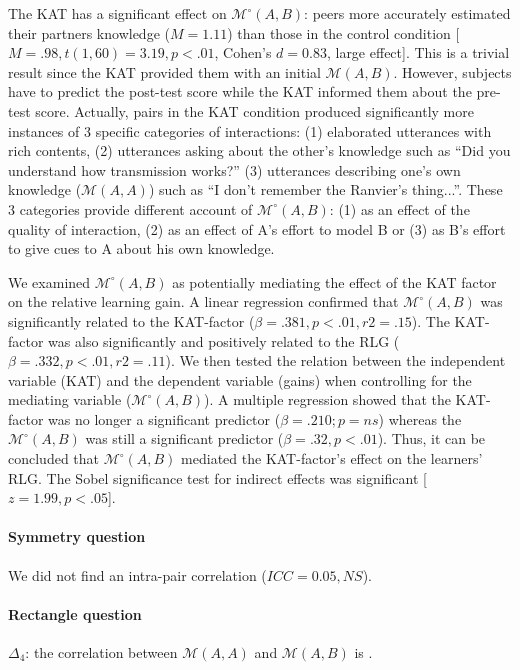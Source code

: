 \documentclass[twocolumn]{article}
\newcommand{\gmodel}[2]{{$\mathcal{M}(#1, #2)$}}
\newcommand{\gModel}[2]{{$\mathcal{M}^{\circ}(#1, #2)$}}
\begin{document}
The KAT has a significant effect on \gModel{A}{B}: peers more accurately
estimated their partners knowledge ($M = 1.11$) than those in the control
condition [$M = .98, t(1, 60) = 3.19, p < .01$, Cohen's $d = 0.83$, large
effect]. This is a trivial result since the KAT provided them with an initial
\gmodel{A}{B}. However, subjects have to predict the post-test score while the
KAT informed them about the pre-test score. Actually, pairs in the KAT condition
produced significantly more instances of 3 specific categories of interactions:
(1) elaborated utterances with rich contents,  (2) utterances asking about the
other's knowledge such as ``Did you understand how transmission works?'' (3)
utterances describing one's own knowledge (\gmodel{A}{A}) such as ``I don't
remember the Ranvier's thing...''. These 3 categories provide different account
of \gModel{A}{B}: (1) as an effect of the quality of interaction, (2) as an
effect of A's effort to model B or (3) as B's effort to give cues to A about his
own knowledge.

We examined \gModel{A}{B} as potentially mediating the effect of the KAT factor
on the relative learning gain. A linear regression confirmed that \gModel{A}{B}
was significantly related to the KAT-factor ($\beta= .381, p < .01, r2 = .15$).
The KAT-factor was also significantly and positively related to the RLG ($\beta=
.332, p < .01, r2 = .11$). We then tested the relation between the independent
variable (KAT) and the dependent variable (gains) when controlling for the
mediating variable (\gModel{A}{B}). A multiple regression showed that the
KAT-factor was no longer a significant predictor ($\beta= .210; p = ns$) whereas
the \gModel{A}{B} was still a significant predictor ($\beta= .32, p < .01$).
Thus, it can be concluded that \gModel{A}{B} mediated the KAT-factor's effect on
the learners' RLG. The Sobel significance test for indirect effects was
significant [$z = 1.99, p < .05$]. 

\paragraph{Symmetry question} We did not find an intra-pair correlation ($ICC =
0.05, NS$).

\paragraph{Rectangle question} $\Delta_4$: the correlation between \gmodel{A}{A} and \gmodel{A}{B} is
.
\end{document}
